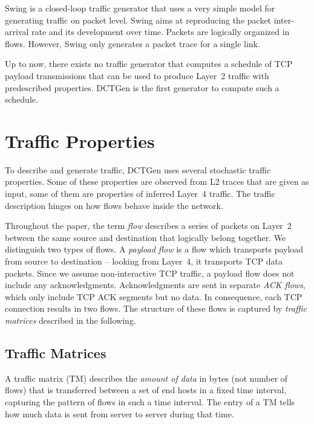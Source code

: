 \documentclass[journal,10pt]{IEEEtran}
\newcommand{\genname}{DCTGen}
\begin{document}
Swing \cite{swing} is a closed-loop traffic generator that uses a very simple model for generating traffic on packet level.
Swing aims at reproducing the packet inter-arrival rate and its development over time. Packets are logically organized in flows.
However, Swing only generates a packet trace for a single link.

Up to now, there exists no traffic generator that computes a schedule of TCP payload transmissions 
that can be used to produce Layer~2 traffic with predescribed properties.
\genname{} is the first generator to compute such a schedule.




\section{Traffic Properties}
\label{sec:traffic}

To describe and generate traffic, \genname{} uses several stochastic traffic properties. Some of these properties are observed from L2 traces that are given as input, some of them are properties of inferred Layer~4 traffic. The traffic description hinges on how flows behave inside the network. 






Throughout the paper, the term \emph{flow} describes a 
series of packets on Layer~2 between the same source and destination that logically belong together. We distinguish two types of flows. 
A \emph{payload flow} is a flow which transports payload from source to destination -- looking from Layer~4, it transports TCP data packets. Since we assume non-interactive TCP traffic, a payload flow does not include any acknowledgments. Acknowledgments are sent in separate \emph{ACK flows}, which only include TCP ACK segments but no data. In consequence, each TCP connection results in two flows. The structure of these flows is captured by \emph{traffic matrices} described in the following.




\subsection{Traffic Matrices}
\label{sec:traffic-matrices}

A traffic matrix (TM) describes the \emph{amount of data} in bytes (not number of flows) that is transferred between a set of end hosts in a fixed time interval, capturing the pattern of flows in such a time interval. The entry  of a TM tells how much data is sent from server  to server  during that time.
\end{document}
